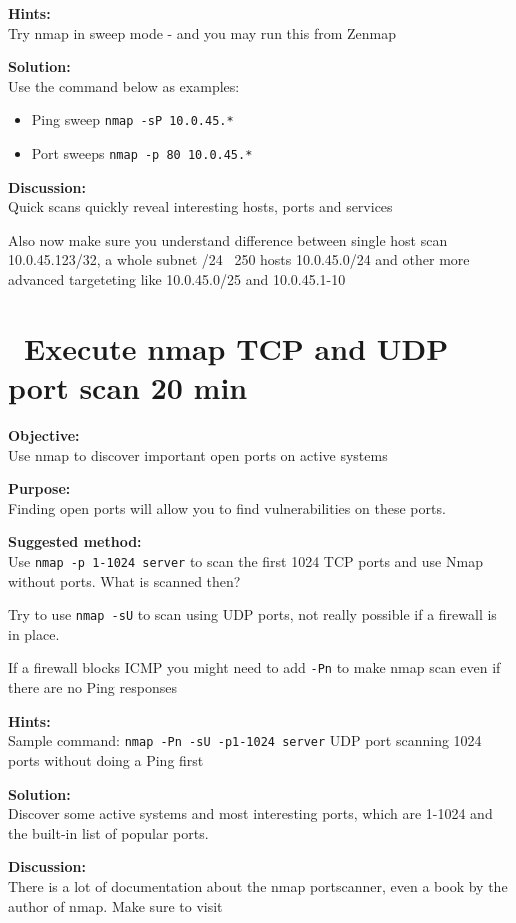 \documentclass[a4paper,11pt,notitlepage]{report}
\begin{document}
{\bf Hints:} \\
Try nmap in sweep mode - and you may run this from Zenmap

{\bf Solution:}\\
Use the command below as examples:
\begin{itemize}
\item Ping sweep \verb+nmap -sP 10.0.45.*+
\item Port sweeps \verb+nmap -p 80 10.0.45.*+
\end{itemize}

{\bf Discussion:}\\
Quick scans quickly reveal interesting hosts, ports and services

Also now make sure you understand difference between single host scan
10.0.45.123/32, a whole subnet /24 ~250 hosts 10.0.45.0/24 and other more advanced targeteting like 10.0.45.0/25 and 10.0.45.1-10


\chapter{\faInfoCircle\ Execute nmap TCP and UDP port scan 20 min}
\label{ex:nmap-synscan}


{\bf Objective:} \\
Use nmap to discover important open ports on active systems

{\bf Purpose:}\\
Finding open ports will allow you to find vulnerabilities on these ports.

{\bf Suggested method:}\\
Use \verb+nmap -p 1-1024 server+ to scan the first 1024 TCP
ports and use Nmap without ports. What is scanned then?

Try to use \verb+nmap -sU+ to scan using UDP ports, not really possible if a firewall is in place.

If a firewall blocks ICMP you might need to add \verb+-Pn+ to make nmap scan even if there are no Ping responses

{\bf Hints:} \\
Sample command: \verb+nmap -Pn -sU -p1-1024 server+ UDP port scanning
1024 ports without doing a Ping first

{\bf Solution:}\\
Discover some active systems and most interesting ports, which are 1-1024 and the built-in list of popular ports.

{\bf Discussion:}\\
There is a lot of documentation about the nmap portscanner, even a book by the author
of nmap. Make sure to visit 
\end{document}
